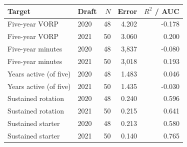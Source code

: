 \begin{tabular}{llrrr}
\toprule
Target & Draft & $N$ & Error & $R^2$ / AUC \\
\midrule
Five-year VORP & 2020 & 48 & 4.202 & -0.178 \\
Five-year VORP & 2021 & 50 & 3.060 & 0.200 \\
Five-year minutes & 2020 & 48 & 3,837 & -0.080 \\
Five-year minutes & 2021 & 50 & 3,018 & 0.193 \\
Years active (of five) & 2020 & 48 & 1.483 & 0.046 \\
Years active (of five) & 2021 & 50 & 1.435 & -0.030 \\
Sustained rotation & 2020 & 48 & 0.240 & 0.596 \\
Sustained rotation & 2021 & 50 & 0.215 & 0.641 \\
Sustained starter & 2020 & 48 & 0.213 & 0.580 \\
Sustained starter & 2021 & 50 & 0.140 & 0.765 \\
\bottomrule
\end{tabular}